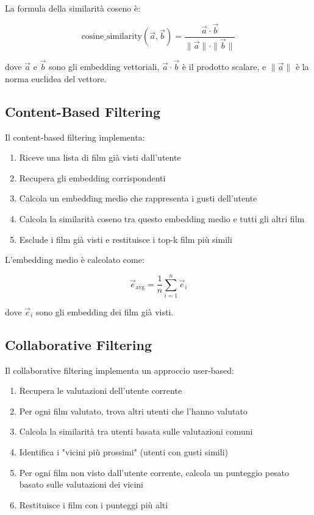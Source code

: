 \documentclass[11pt,a4paper]{article}
\begin{document}
La formula della similarità coseno è:

\begin{equation}
\text{cosine\_similarity}(\vec{a}, \vec{b}) = \frac{\vec{a} \cdot \vec{b}}{\|\vec{a}\| \cdot \|\vec{b}\|}
\end{equation}

dove $\vec{a}$ e $\vec{b}$ sono gli embedding vettoriali, $\vec{a} \cdot \vec{b}$ è il prodotto scalare, e $\|\vec{a}\|$ è la norma euclidea del vettore.

\subsection{Content-Based Filtering}
Il content-based filtering implementa:

\begin{enumerate}
  \item Riceve una lista di film già visti dall'utente
  \item Recupera gli embedding corrispondenti
  \item Calcola un embedding medio che rappresenta i gusti dell'utente
  \item Calcola la similarità coseno tra questo embedding medio e tutti gli altri film
  \item Esclude i film già visti e restituisce i top-k film più simili
\end{enumerate}

L'embedding medio è calcolato come:

\begin{equation}
\vec{e}_{\text{avg}} = \frac{1}{n} \sum_{i=1}^{n} \vec{e}_i
\end{equation}

dove $\vec{e}_i$ sono gli embedding dei film già visti.

\subsection{Collaborative Filtering}
Il collaborative filtering implementa un approccio user-based:

\begin{enumerate}
  \item Recupera le valutazioni dell'utente corrente
  \item Per ogni film valutato, trova altri utenti che l'hanno valutato
  \item Calcola la similarità tra utenti basata sulle valutazioni comuni
  \item Identifica i "vicini più prossimi" (utenti con gusti simili)
  \item Per ogni film non visto dall'utente corrente, calcola un punteggio pesato basato sulle valutazioni dei vicini
  \item Restituisce i film con i punteggi più alti
\end{enumerate}
\end{document}
